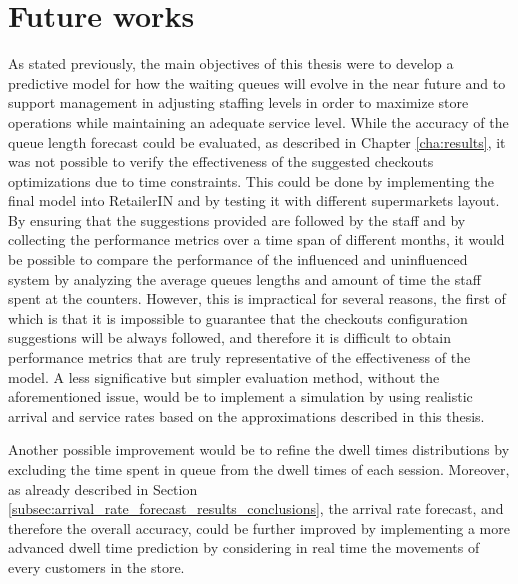 \section{Future works}
\label{sec:future_works}

As stated previously, the main objectives of this thesis were to develop a predictive model for how the waiting queues will evolve in the near future and to support management in adjusting staffing levels in order to maximize store operations while maintaining an adequate service level. While the accuracy of the queue length forecast could be evaluated, as described in Chapter \ref{cha:results}, it was not possible to verify the effectiveness of the suggested checkouts optimizations due to time constraints. This could be done by implementing the final model into RetailerIN and by testing it with different supermarkets layout. By ensuring that the suggestions provided are followed by the staff and by collecting the performance metrics over a time span of different months, it would be possible to compare the performance of the influenced and uninfluenced system by analyzing the average queues lengths and amount of time the staff spent at the counters. However, this is impractical for several reasons, the first of which is that it is impossible to guarantee that the checkouts configuration suggestions will be always followed, and therefore it is difficult to obtain performance metrics that are  truly representative of the effectiveness of the model. A less significative but simpler evaluation method, without the aforementioned issue, would be to implement a simulation by using realistic arrival and service rates based on the approximations described in this thesis.

Another possible improvement would be to refine the dwell times distributions by excluding the time spent in queue from the dwell times of each session. Moreover, as already described in Section \ref{subsec:arrival_rate_forecast_results_conclusions}, the arrival rate forecast, and therefore the overall accuracy, could be further improved by implementing a more advanced dwell time prediction by considering in real time the movements of every customers in the store.

\clearpage


